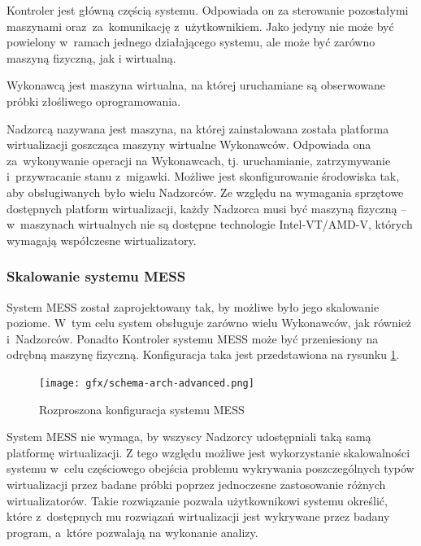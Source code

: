 \documentclass[a4paper,12pt,oneside]{article}
\begin{document}
	Kontroler jest główną częścią systemu. Odpowiada on za sterowanie pozostałymi maszynami oraz~za~komunikację z~użytkownikiem. Jako jedyny nie może być powielony w~ramach jednego działającego systemu, ale może być zarówno maszyną fizyczną, jak i wirtualną. 
	
	Wykonawcą jest maszyna wirtualna, na której uruchamiane są obserwowane próbki złośliwego oprogramowania.
	
	Nadzorcą nazywana jest maszyna, na której zainstalowana została platforma wirtualizacji goszcząca maszyny wirtualne Wykonawców. Odpowiada ona za~wykonywanie operacji na Wykonawcach, tj. uruchamianie, zatrzymywanie i~przywracanie stanu z~migawki. Możliwe jest skonfigurowanie środowiska tak, aby obsługiwanych było wielu Nadzorców. Ze względu na wymagania sprzętowe dostępnych platform wirtualizacji, każdy Nadzorca musi być maszyną fizyczną -- w~maszynach wirtualnych nie są dostępne technologie Intel-VT/AMD-V, których wymagają współczesne wirtualizatory.

	\subsubsection{Skalowanie systemu MESS}
		
	System MESS został zaprojektowany tak, by możliwe było jego skalowanie poziome. W~tym celu system obsługuje zarówno wielu Wykonawców, jak również i~Nadzorców. Ponadto Kontroler systemu MESS może być przeniesiony na odrębną maszynę fizyczną. Konfiguracja taka jest przedstawiona na rysunku \ref{gfx--schema-arch-advanced}.	
	
	\begin{figure}[h!]
		\texttt{[image: gfx/schema-arch-advanced.png]}
		\caption{Rozproszona konfiguracja systemu MESS}
		\label{gfx--schema-arch-advanced}
	\end{figure}
	
	System MESS nie wymaga, by wszyscy Nadzorcy udostępniali taką samą platformę wirtualizacji. Z tego względu możliwe jest wykorzystanie skalowalności systemu w~celu częściowego obejścia problemu wykrywania poszczególnych typów wirtualizacji przez badane próbki poprzez jednoczesne zastosowanie różnych wirtualizatorów. Takie rozwiązanie pozwala użytkownikowi systemu określić, które z~dostępnych mu rozwiązań wirtualizacji jest wykrywane przez badany program, a~które pozwalają na wykonanie analizy.	
		
\end{document}
